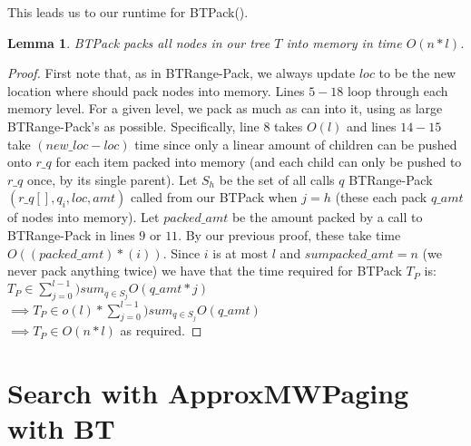\documentclass[letterpaper,12pt,titlepage,oneside,final]{book}
\theoremstyle{plain}
\newtheorem{lem}[thm]{Lemma}
\begin{document}
This leads us to our runtime for BT\textendash Pack(). 

\begin{lem}
BT\textendash Pack packs all nodes in our tree $T$ into memory in time $O(n*l)$.
\end{lem}

\begin{proof}

First note that, as in BT\textendash Range-Pack, we always update $loc$ to be the new location where should pack nodes into memory. Lines $5-18$ loop through each memory level. For a given level, we pack as much as can into it, using as large BT\textendash Range-Pack's as possible. Specifically, line $8$ takes $O(l)$ and lines $14-15$ take $(new\_loc - loc)$ time since only a linear amount of children can be pushed onto $r\_q$ for each item packed into memory (and each child can only be pushed to $r\_q$ once, by its single parent). Let $S_h$ be the set of all calls $q$ BT\textendash Range-Pack$(r\_q[], q_i, loc, amt)$ called from our BT\textendash Pack when $j = h$ (these each pack $q\_amt$ of nodes into memory). Let $packed\_amt$ be the amount packed by a call to BT\textendash Range-Pack in lines $9$ or $11$. By our previous proof, these take time $O((packed\_amt)*(i))$. Since $i$ is at most $l$ and $sum packed\_amt = n$ (we never pack anything twice) we have that the time required for BT\textendash Pack $T_P$ is: \\
$T_{P} \in \sum_{j=0}^{l-1})sum_{q \in S_j} O(q\_amt*j)$ \\
$\implies T_{P} \in o(l) * \sum_{j=0}^{l-1})sum_{q \in S_j} O(q\_amt)$ \\
$\implies T_{P} \in O(n*l)$ as required.

\end{proof}


\section{Search with ApproxMWPaging with BT}
\end{document}
